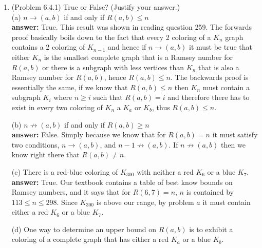 \documentclass{amsart}
\begin{document}
\thispagestyle{fancy}
 
\begin{enumerate}
\item (Problem 6.4.1) True or False? (Justify your answer.)\\

(a) $n \rightarrow (a,b)$ if and only if $R(a,b) \leq n$\\

\textbf{answer:} True. This result was shown in reading question 259. The forwards proof basically boils down to the fact that every 2 coloring of a $K_{n}$ graph contains a 2 coloring of $K_{n-1}$ and hence if $n \rightarrow (a,b)$ it must be true that either $K_n$ is the smallest complete graph that is a Ramsey number for $R(a,b)$ or there is a subgraph with less vertices than $K_n$ that is also a Ramsey number for $R(a,b)$, hence $R(a,b) \leq n$. The backwards proof is essentially the same, if we know that $R(a,b) \leq n$ then $K_n$ must contain a subgraph $K_i$ where $n\geq i$ such that $R(a,b)  =  i$ and therefore there has to exist in every two coloring of $K_n$ a $K_a$ or $K_b$, thus $R(a,b) \leq n$.

\vspace{1in}

(b) $n \not\rightarrow (a,b)$ if and only if $R(a,b) \geq n$\\

\textbf{answer:} False. Simply because we know that for $R(a,b)  =  n$ it must satisfy two conditions, $n \rightarrow (a,b)$, and $n-1 \not\rightarrow (a,b)$. If $n \not\rightarrow (a,b)$ then we know right there that $R(a,b) \neq n$.\\

\vspace{1in}

(c) There is a red-blue coloring of $K_{300}$ with neither a red $K_6$ or a blue $K_7.$\\

\textbf{answer:} True. Our textbook contains a table of best know bounds on Ramsey numbers, and it says that for $R(6,7)  =  n$, $n$ is contained by $113 \leq n \leq 298$. Since $K_{300}$ is above our range, by problem $a$ it must contain either a red $K_6$ or a blue $K_7.$ \\

\vspace{1in}

(d) One way to determine an upper bound on $R(a,b)$ is to exhibit a coloring of a complete graph that has either a red $K_a$ or a blue $K_b.$\\



\end{enumerate}
\end{document}
